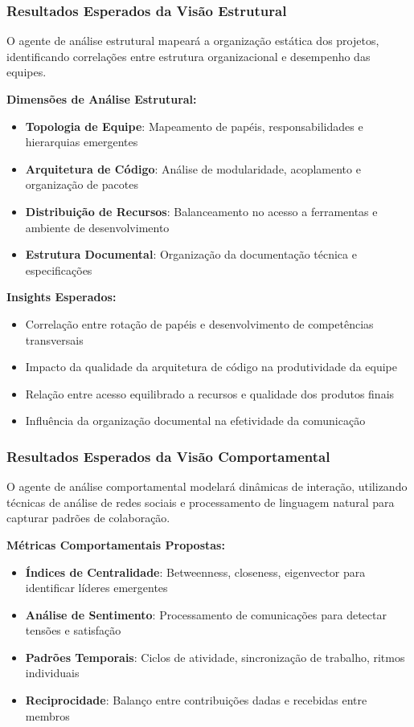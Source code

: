 \documentclass[english, spanish, brazilian]{modelo_dt}
\begin{document}
\subsubsection{Resultados Esperados da Visão Estrutural}

O agente de análise estrutural mapeará a organização estática dos projetos,
identificando correlações entre estrutura organizacional e desempenho das
equipes.

\textbf{Dimensões de Análise Estrutural:}
\begin{itemize}
  \item \textbf{Topologia de Equipe}: Mapeamento de papéis, responsabilidades e hierarquias emergentes
  \item \textbf{Arquitetura de Código}: Análise de modularidade, acoplamento e organização de pacotes
  \item \textbf{Distribuição de Recursos}: Balanceamento no acesso a ferramentas e ambiente de desenvolvimento
  \item \textbf{Estrutura Documental}: Organização da documentação técnica e especificações
\end{itemize}

\textbf{Insights Esperados:}
\begin{itemize}
  \item Correlação entre rotação de papéis e desenvolvimento de competências
        transversais
  \item Impacto da qualidade da arquitetura de código na produtividade da equipe
  \item Relação entre acesso equilibrado a recursos e qualidade dos produtos finais
  \item Influência da organização documental na efetividade da comunicação
\end{itemize}

\subsubsection{Resultados Esperados da Visão Comportamental}

O agente de análise comportamental modelará dinâmicas de interação, utilizando
técnicas de análise de redes sociais e processamento de linguagem natural para
capturar padrões de colaboração.

\textbf{Métricas Comportamentais Propostas:}
\begin{itemize}
  \item \textbf{Índices de Centralidade}: Betweenness, closeness, eigenvector para identificar líderes emergentes
  \item \textbf{Análise de Sentimento}: Processamento de comunicações para detectar tensões e satisfação
  \item \textbf{Padrões Temporais}: Ciclos de atividade, sincronização de trabalho, ritmos individuais
  \item \textbf{Reciprocidade}: Balanço entre contribuições dadas e recebidas entre membros
\end{itemize}
\end{document}

